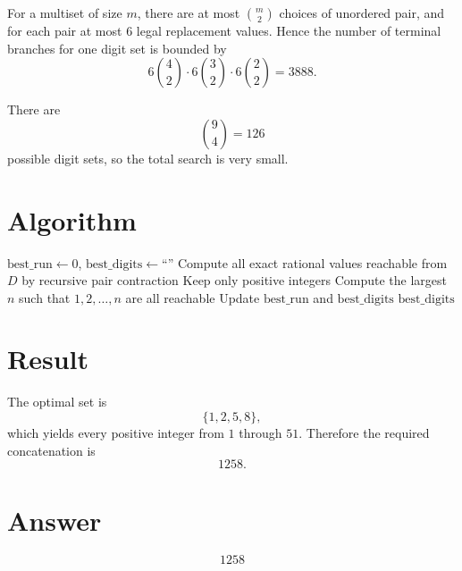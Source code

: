 \documentclass[12pt]{article}
\begin{document}
For a multiset of size $m$, there are at most $\binom{m}{2}$ choices of unordered pair, and for each pair at most $6$ legal replacement values. Hence the number of terminal branches for one digit set is bounded by
\[
6\binom{4}{2}\cdot 6\binom{3}{2}\cdot 6\binom{2}{2}
=3888.
\]

There are
\[
\binom{9}{4}=126
\]
possible digit sets, so the total search is very small.

\section{Algorithm}

\begin{algorithm}[H]
\caption{Search all 4-digit sets}
\begin{algorithmic}[1]
\STATE $\mathrm{best\_run}\gets 0$, $\mathrm{best\_digits}\gets \text{``''}$
    \STATE Compute all exact rational values reachable from $D$ by recursive pair contraction
    \STATE Keep only positive integers
    \STATE Compute the largest $n$ such that $1,2,\dots,n$ are all reachable
        \STATE Update $\mathrm{best\_run}$ and $\mathrm{best\_digits}$
    \ENDIF
\ENDFOR
\RETURN $\mathrm{best\_digits}$
\end{algorithmic}
\end{algorithm}

\section{Result}

The optimal set is
\[
\{1,2,5,8\},
\]
which yields every positive integer from $1$ through $51$. Therefore the required concatenation is
\[
\boxed{1258}.
\]

\section{Answer}

\[
\boxed{1258}
\]
\end{document}
